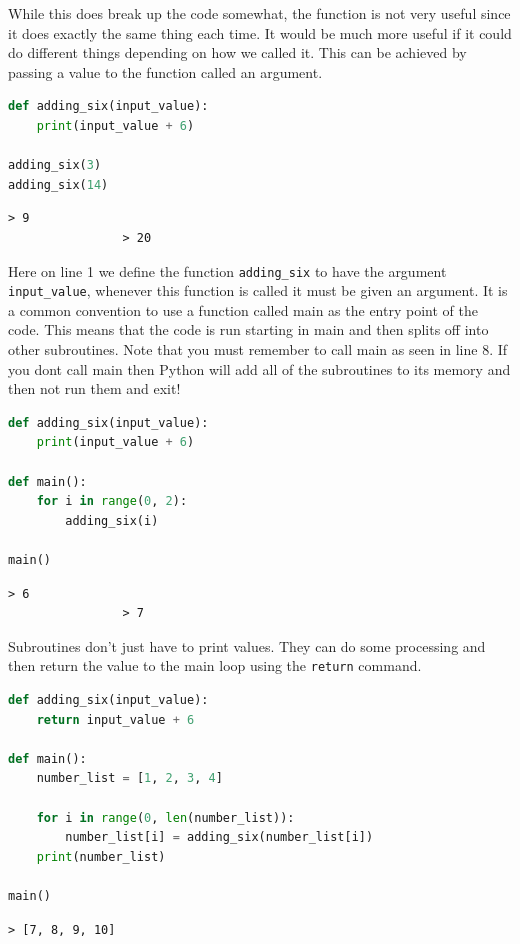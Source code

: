 While this does break up the code somewhat, the function is not very useful since it does exactly the same thing each time. It would be much more useful if it could do different things depending on how we called it. This can be achieved by passing a value to the function called an argument.

			\begin{lstlisting}[language=Python]
def adding_six(input_value):
	print(input_value + 6)

adding_six(3)
adding_six(14)\end{lstlisting}
			\begin{verbatim}> 9
				> 20\end{verbatim}

				Here on line 1 we define the function \texttt{adding\_six} to have the argument \texttt{input\_value}, whenever this function is called it must be given an argument. It is a common convention to use a function called main as the entry point of the code. This means that the code is run starting in main and then splits off into other subroutines. Note that you must remember to call main as seen in line 8. If you dont call main then Python will add all of the subroutines to its memory and then not run them and exit!
				
			\begin{lstlisting}[language=Python]
def adding_six(input_value):
	print(input_value + 6)

def main():
	for i in range(0, 2):
		adding_six(i)
		
main()\end{lstlisting}
			\begin{verbatim}> 6
				> 7\end{verbatim}
				
				Subroutines don't just have to print values. They can do some processing and then return the value to the main loop using the \texttt{return} command.

			\begin{lstlisting}[language=Python]
def adding_six(input_value):
	return input_value + 6

def main():
	number_list = [1, 2, 3, 4]
	
	for i in range(0, len(number_list)):
		number_list[i] = adding_six(number_list[i])
	print(number_list)
			
main()\end{lstlisting}

			\begin{verbatim}> [7, 8, 9, 10]\end{verbatim}
			
